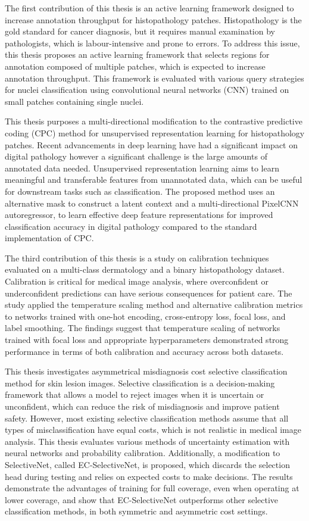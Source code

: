 \documentclass[12pt]{report}
\begin{document}
	The first contribution of this thesis is an active learning framework designed to increase annotation throughput for histopathology patches. Histopathology is the gold standard for cancer diagnosis, but it requires manual examination by pathologists, which is labour-intensive and prone to errors. To address this issue, this thesis proposes an active learning framework that selects regions for annotation composed of multiple patches, which is expected to increase annotation throughput. This framework is evaluated with various query strategies for nuclei classification using convolutional neural networks (CNN) trained on small patches containing single nuclei.
	
	This thesis purposes a multi-directional modification to the contrastive predictive coding (CPC) method for unsupervised representation learning for histopathology patches. Recent advancements in deep learning have had a significant impact on digital pathology however a significant challenge is the large amounts of annotated data needed. Unsupervised representation learning aims to learn meaningful and transferable features from unannotated data, which can be useful for downstream tasks such as classification. The proposed method uses an alternative mask to construct a latent context and a multi-directional PixelCNN autoregressor, to learn effective deep feature representations for improved classification accuracy in digital pathology compared to the standard implementation of CPC.
	
	The third contribution of this thesis is a study on calibration techniques evaluated on a multi-class dermatology and a binary histopathology dataset. Calibration is critical for medical image analysis, where overconfident or underconfident predictions can have serious consequences for patient care. The study applied the temperature scaling method and alternative calibration metrics to networks trained with one-hot encoding, cross-entropy loss, focal loss, and label smoothing. The findings suggest that temperature scaling of networks trained with focal loss and appropriate hyperparameters demonstrated strong performance in terms of both calibration and accuracy across both datasets.
	
	This thesis investigates asymmetrical misdiagnosis cost selective classification method for skin lesion images. Selective classification is a decision-making framework that allows a model to reject images when it is uncertain or unconfident, which can reduce the risk of misdiagnosis and improve patient safety. However, most existing selective classification methods assume that all types of misclassification have equal costs, which is not realistic in medical image analysis. This thesis evaluates various methods of uncertainty estimation with neural networks and probability calibration. Additionally, a modification to SelectiveNet, called EC-SelectiveNet, is proposed, which discards the selection head during testing and relies on expected costs to make decisions. The results demonstrate the advantages of training for full coverage, even when operating at lower coverage, and show that EC-SelectiveNet outperforms other selective classification methods, in both symmetric and asymmetric cost settings.
	
\end{document}
